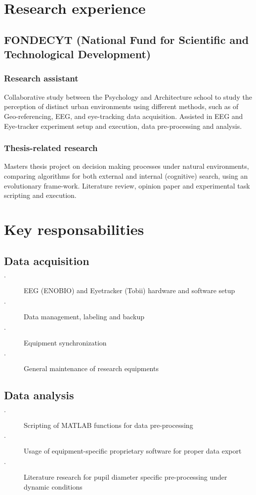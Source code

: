 \documentclass{article}
\begin{document}
\section{Research experience}
\subsection{FONDECYT {\small(National Fund for Scientific and Technological Development)}}
\subsubsection{Research assistant}
Collaborative study between the Psychology and Architecture school to study the perception of distinct urban environments using different methods, such as of Geo-referencing, EEG, and eye-tracking data acquisition. Assisted in EEG and Eye-tracker experiment setup and execution, data pre-processing and analysis.
\subsubsection{Thesis-related research}
Masters thesis project on decision making processes under natural environments, comparing algorithms for both external and internal (cognitive) search, using an evolutionary frame-work. Literature review, opinion paper and experimental task scripting and execution.

\section{Key responsabilities}
\subsection{Data acquisition}
\begin{description}
    \item[$\cdot$] EEG (ENOBIO) and Eyetracker (Tobii) hardware and software setup
    \item[$\cdot$] Data management, labeling and backup
    \item[$\cdot$] Equipment synchronization
    \item[$\cdot$] General maintenance of research equipments
\end{description}
\subsection{Data analysis}
\begin{description}
    \item[$\cdot$] Scripting of MATLAB functions for data pre-processing
    \item[$\cdot$] Usage of equipment-specific proprietary software for proper data export
    \item[$\cdot$] Literature research for pupil diameter specific pre-processing  under dynamic conditions 
\end{description}
\end{document}
